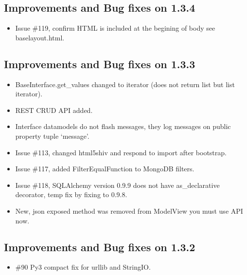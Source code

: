 \documentclass[letterpaper,10pt,english]{sphinxmanual}
\begin{document}
\subsection{Improvements and Bug fixes on 1.3.4}
\label{versions:improvements-and-bug-fixes-on-1-3-4}\begin{itemize}
\item {} 
Issue \#119, confirm HTML is included at the begining of body see baselayout.html.

\end{itemize}


\subsection{Improvements and Bug fixes on 1.3.3}
\label{versions:improvements-and-bug-fixes-on-1-3-3}\begin{itemize}
\item {} 
BaseInterface.get\_values changed to iterator (does not return list but list iterator).

\item {} 
REST CRUD API added.

\item {} 
Interface datamodels do not flash messages, they log messages on public property tuple `message'.

\item {} 
Issue \#113, changed html5shiv and respond to import after bootstrap.

\item {} 
Issue \#117, added FilterEqualFunction to MongoDB filters.

\item {} 
Issue \#118, SQLAlchemy version 0.9.9 does not have as\_declarative decorator, temp fix by fixing to 0.9.8.

\item {} 
New, json exposed method was removed from ModelView you must use API now.

\end{itemize}


\subsection{Improvements and Bug fixes on 1.3.2}
\label{versions:improvements-and-bug-fixes-on-1-3-2}\begin{itemize}
\item {} 
\#90 Py3 compact fix for urllib and StringIO.

\end{itemize}
\end{document}
